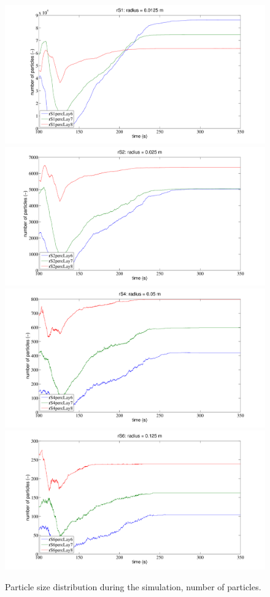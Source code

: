 \begin{figure}
\centering 
  \subfloat%
  {
	  \includegraphics[width=.48\columnwidth]{images/114rS120151111151255}
	  \label{fig:114rS120151111151255}
  }
  \quad
    \subfloat
    {
	  \includegraphics[width=.48\columnwidth]{images/116rS220151111151255}
	  \label{fig:116rS220151111151255}
  }
  \\
  \subfloat%
  {
	  \includegraphics[width=.48\columnwidth]{images/118rS420151111151255}
	  \label{fig:118rS420151111151255}
  }
  \quad
    \subfloat%
    {
	  \includegraphics[width=.48\columnwidth]{images/120rS620151111151255}
	  \label{fig:120rS620151111151255}  }
  \\
  \caption{Particle size distribution during the simulation, number of
  particles.}
  \label{fig:223sinterplots2}
\end{figure}